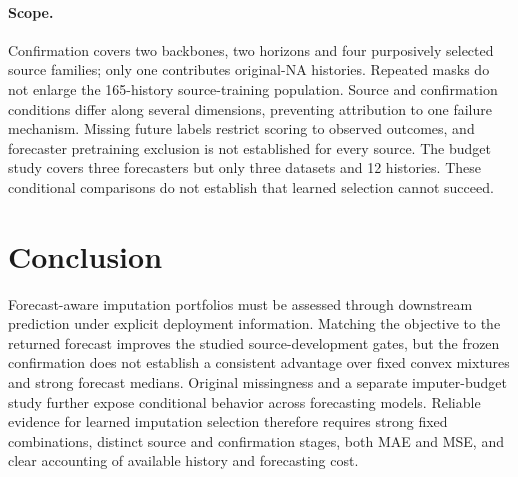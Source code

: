 \documentclass{article}
\begin{document}
\paragraph{Scope.}
Confirmation covers two backbones, two horizons and four purposively selected source families; only one contributes original-NA histories. Repeated masks do not enlarge the 165-history source-training population. Source and confirmation conditions differ along several dimensions, preventing attribution to one failure mechanism. Missing future labels restrict scoring to observed outcomes, and forecaster pretraining exclusion is not established for every source. The budget study covers three forecasters but only three datasets and 12 histories. These conditional comparisons do not establish that learned selection cannot succeed.

\section{Conclusion}

Forecast-aware imputation portfolios must be assessed through downstream prediction under explicit deployment information. Matching the objective to the returned forecast improves the studied source-development gates, but the frozen confirmation does not establish a consistent advantage over fixed convex mixtures and strong forecast medians. Original missingness and a separate imputer-budget study further expose conditional behavior across forecasting models. Reliable evidence for learned imputation selection therefore requires strong fixed combinations, distinct source and confirmation stages, both MAE and MSE, and clear accounting of available history and forecasting cost.




\clearpage
\appendix

\clearpage

\clearpage

\clearpage

\end{document}
